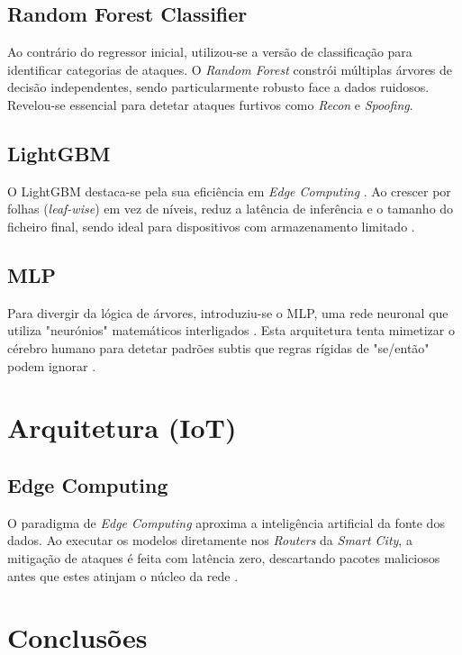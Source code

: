 \subsection{Random Forest Classifier}
Ao contrário do regressor inicial, utilizou-se a versão de classificação para identificar categorias de ataques. O \textit{Random Forest} constrói múltiplas árvores de decisão independentes, sendo particularmente robusto face a dados ruidosos. Revelou-se essencial para detetar ataques furtivos como \textit{Recon} e \textit{Spoofing}.

\subsection{LightGBM}
O \ac{LightGBM} destaca-se pela sua eficiência em \textit{Edge Computing} \cite{ke2017lightgbm}. Ao crescer por folhas (\textit{leaf-wise}) em vez de níveis, reduz a latência de inferência e o tamanho do ficheiro final, sendo ideal para dispositivos com armazenamento limitado \cite{AlGaradi2020}.

\subsection{MLP}
Para divergir da lógica de árvores, introduziu-se o \ac{MLP}, uma rede neuronal que utiliza "neurónios" matemáticos interligados \cite{Berman2019}. Esta arquitetura tenta mimetizar o cérebro humano para detetar padrões subtis que regras rígidas de "se/então" podem ignorar \cite{AlGaradi2020}.

\section{Arquitetura (IoT)}
\label{chap3:sec:arq}

\subsection{Edge Computing}
O paradigma de \textit{Edge Computing} aproxima a inteligência artificial da fonte dos dados. Ao executar os modelos diretamente nos \textit{Routers} da \textit{Smart City}, a mitigação de ataques é feita com latência zero, descartando pacotes maliciosos antes que estes atinjam o núcleo da rede \cite{Chen2019}.

\section{Conclusões}
\label{chap3:sec:concs}

